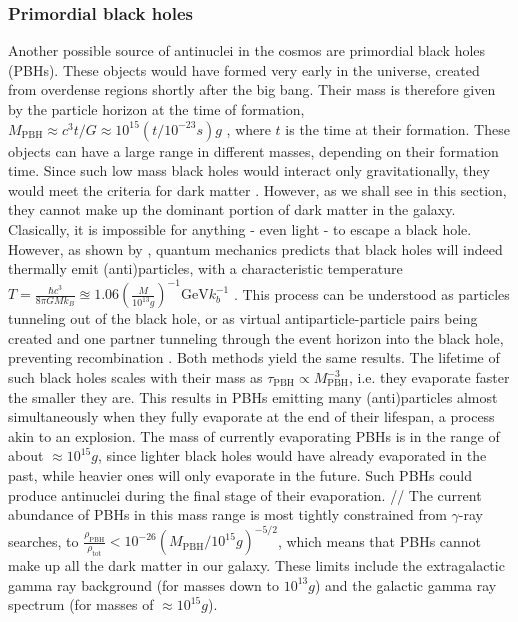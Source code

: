 \subsubsection{Primordial black holes}
Another possible source of antinuclei in the cosmos are primordial black holes (PBHs). These objects would have formed very early in the universe, created from overdense regions shortly after the big bang. Their mass is therefore given by the particle horizon at the time of formation, $M_\mathrm{PBH} \approx c^3t/G \approx 10^{15} (t/10^{-23}s)g$ \cite{}, where $t$ is the time at their formation. These objects can have a large range in different masses, depending on their formation time. Since such low mass black holes would interact only gravitationally, they would meet the criteria for dark matter \cite{}. However, as we shall see in this section, they cannot make up the dominant portion of dark matter in the galaxy. \\
Clasically, it is impossible for anything - even light - to escape a black hole. However, as shown by \cite{}, quantum mechanics predicts that black holes will indeed thermally emit (anti)particles, with a characteristic temperature $T = \frac{\hbar c^3}{8\pi GM k_B} \approxeq 1.06 \left( \frac{M}{10^{13}g}\right)^{-1} \mathrm{GeV} k_b^{-1}$ \cite{}. This process can be understood as particles tunneling out of the black hole\cite{}, or as virtual antiparticle-particle pairs being created and one partner tunneling through the event horizon into the black hole, preventing recombination \cite{}. Both methods yield the same results. The lifetime of such black holes scales with their mass as $\tau_\mathrm{PBH} \propto M_\mathrm{PBH}^{-3}$, i.e. they evaporate faster the smaller they are. This results in PBHs emitting many (anti)particles almost simultaneously when they fully evaporate at the end of their lifespan, a process akin to an explosion. The mass of currently evaporating PBHs is in the range of about $\approx 10^{15}g$, since lighter black holes would have already evaporated in the past, while heavier ones will only evaporate in the future. Such PBHs could produce antinuclei during the final stage of their evaporation. //
The current abundance of PBHs in this mass range is most tightly constrained from $\gamma$-ray searches\cite{}, to $\frac{\rho_\mathrm{PBH}}{\rho_\mathrm{tot}} < 10^{-26} (M_\mathrm{PBH}/10^{15}g)^{-5/2}$, which means that PBHs cannot make up all the dark matter in our galaxy. These limits include the extragalactic gamma ray background (for masses down to $10^{13}g$) and the galactic gamma ray spectrum (for masses of $\approx 10^{15}g$).\\

